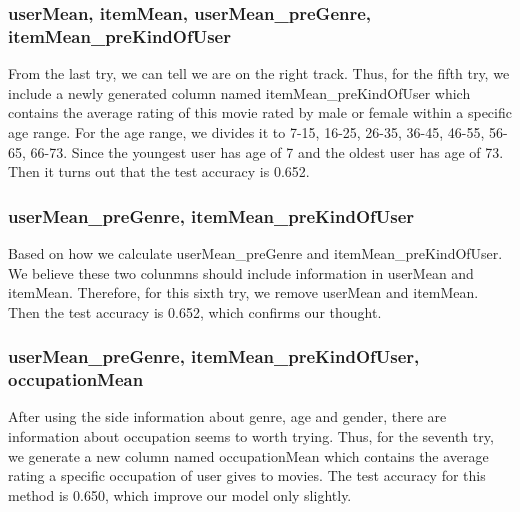 \documentclass{article}
\begin{document}
\subsubsection{userMean, itemMean, userMean\_preGenre, itemMean\_preKindOfUser}
From the last try, we can tell we are on the right track. Thus, for the fifth try, we include a newly generated column named itemMean\_preKindOfUser which contains the average rating of this movie rated by male or female within a specific age range. For the age range, we divides it to 7-15, 16-25, 26-35, 36-45, 46-55, 56-65, 66-73. Since the youngest user has age of 7 and the oldest user has age of 73. Then it turns out that the test accuracy is 0.652.
\subsubsection{userMean\_preGenre, itemMean\_preKindOfUser}
Based on how we calculate userMean\_preGenre and itemMean\_preKindOfUser. We believe these two colunmns should include information in userMean and itemMean. Therefore, for this sixth try, we remove userMean and itemMean. Then the test accuracy is 0.652, which confirms our thought.
\subsubsection{userMean\_preGenre, itemMean\_preKindOfUser, occupationMean}
After using the side information about genre, age and gender, there are information about occupation seems to worth trying. Thus, for the seventh try, we generate a new column named occupationMean which contains the average rating a specific occupation of user gives to movies. The test accuracy for this method is 0.650, which improve our model only slightly. 
\end{document}
